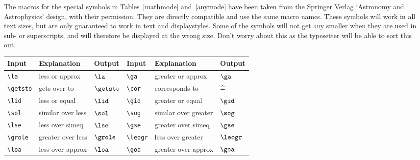 \documentclass{gji}
\begin{document}
The macros for the special symbols in Tables~\ref{mathmode}
and~\ref{anymode}
have been taken from the Springer Verlag `Astronomy and Astrophysics'
design, with their permission. They are directly compatible and use the
same macro names.
These symbols will work in all text sizes, but are only guaranteed to work
in text and displaystyles. Some of the symbols will not get any smaller
when they are used in sub- or superscripts, and will therefore be
displayed at the wrong size. Don't worry about this as the typesetter
will be able to sort this out.
%
\begin{table*}
\begin{minipage}{106mm}
\caption{Special symbols which can only be used in math mode.}
\label{mathmode}
\begin{tabular}{@{}llllll}
Input & Explanation & Output & Input & Explanation & Output\\
\hline
\verb"\la"     & less or approx       & $\la$     &
  \verb"\ga"     & greater or approx    & $\ga$\\[2pt]
\verb"\getsto" & gets over to         & $\getsto$ &
  \verb"\cor"    & corresponds to       & $\cor$\\[2pt]
\verb"\lid"    & less or equal        & $\lid$    &
  \verb"\gid"    & greater or equal     & $\gid$\\[2pt]
\verb"\sol"    & similar over less    & $\sol$    &
  \verb"\sog"    & similar over greater & $\sog$\\[2pt]
\verb"\lse"    & less over simeq      & $\lse$    &
  \verb"\gse"    & greater over simeq   & $\gse$\\[2pt]
\verb"\grole"  & greater over less    & $\grole$  &
  \verb"\leogr"  & less over greater    & $\leogr$\\[2pt]
\verb"\loa"    & less over approx     & $\loa$    &
  \verb"\goa"    & greater over approx  & $\goa$\\
\hline
\end{tabular}
\end{minipage}
\end{table*}
%
\end{document}
